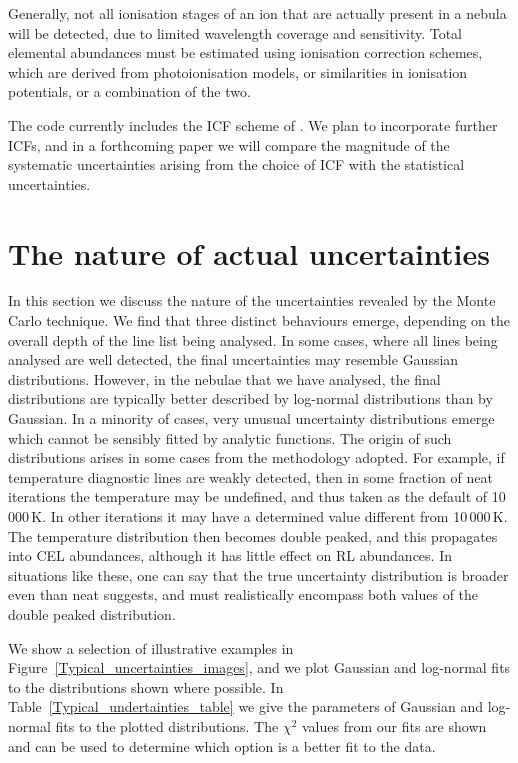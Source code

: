 \documentclass[useAMS,usenatbib]{mn2e}
\begin{document}
Generally, not all ionisation stages of an ion that are actually present in a nebula will be detected, due to limited wavelength coverage and sensitivity.  Total elemental abundances must be estimated using ionisation correction schemes, which are derived from photoionisation models, or similarities in ionisation potentials, or a combination of the two.

The code currently includes the ICF scheme of \citet{1994MNRAS.271..257K}.  We plan to incorporate further ICFs, and in a forthcoming paper we will compare the magnitude of the systematic uncertainties arising from the choice of ICF with the statistical uncertainties.

\section{The nature of actual uncertainties}

In this section we discuss the nature of the uncertainties revealed by the Monte Carlo technique.  We find that three distinct behaviours emerge, depending on the overall depth of the line list being analysed.  In some cases, where all lines being analysed are well detected, the final uncertainties may resemble Gaussian distributions.  However, in the nebulae that we have analysed, the final distributions are typically better described by log-normal distributions than by Gaussian.  In a minority of cases, very unusual uncertainty distributions emerge which cannot be sensibly fitted by analytic functions.  The origin of such distributions arises in some cases from the methodology adopted.  For example, if temperature diagnostic lines are weakly detected, then in some fraction of {\sc neat} iterations the temperature may be undefined, and thus taken as the default of 10\,000\,K.  In other iterations it may have a determined value different from 10\,000\,K.  The temperature distribution then becomes double peaked, and this propagates into CEL abundances, although it has little effect on RL abundances.  In situations like these, one can say that the true uncertainty distribution is broader even than {\sc neat} suggests, and must realistically encompass both values of the double peaked distribution.

We show a selection of illustrative examples in Figure~\ref{Typical_uncertainties_images}, and we plot Gaussian and log-normal fits to the distributions shown where possible.  In Table~\ref{Typical_undertainties_table} we give the parameters of Gaussian and log-normal fits to the plotted distributions.  The $\chi^2$ values from our fits are shown and can be used to determine which option is a better fit to the data.
\end{document}
